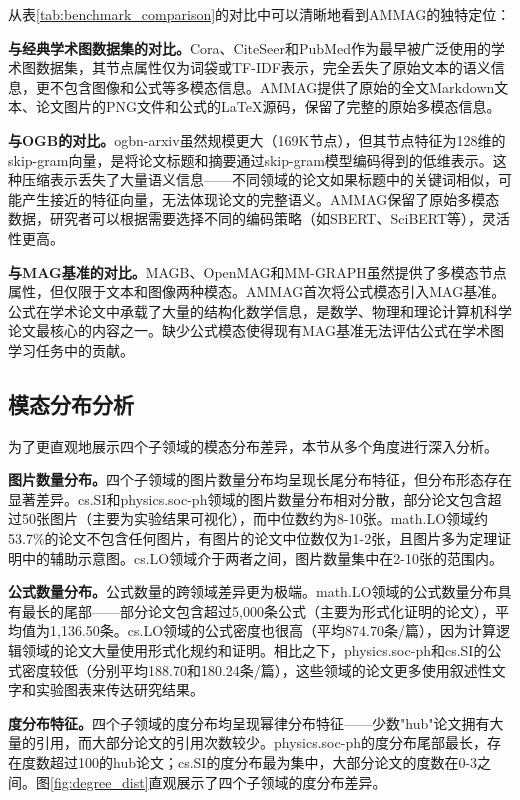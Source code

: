 从表\ref{tab:benchmark_comparison}的对比中可以清晰地看到AMMAG的独特定位：

\textbf{与经典学术图数据集的对比。}Cora\cite{sen2008collective}、CiteSeer\cite{giles1998citeseer}和PubMed\cite{sen2008collective}作为最早被广泛使用的学术图数据集，其节点属性仅为词袋或TF-IDF表示，完全丢失了原始文本的语义信息，更不包含图像和公式等多模态信息。AMMAG提供了原始的全文Markdown文本、论文图片的PNG文件和公式的LaTeX源码，保留了完整的原始多模态信息。

\textbf{与OGB的对比。}ogbn-arxiv\cite{hu2020ogb}虽然规模更大（169K节点），但其节点特征为128维的skip-gram向量，是将论文标题和摘要通过skip-gram模型编码得到的低维表示。这种压缩表示丢失了大量语义信息——不同领域的论文如果标题中的关键词相似，可能产生接近的特征向量，无法体现论文的完整语义。AMMAG保留了原始多模态数据，研究者可以根据需要选择不同的编码策略（如SBERT\cite{reimers2019sbert}、SciBERT\cite{beltagy2019scibert}等），灵活性更高。

\textbf{与MAG基准的对比。}MAGB\cite{yan2025magb}、OpenMAG\cite{wan2026openmag}和MM-GRAPH\cite{zhu2025mmgraph}虽然提供了多模态节点属性，但仅限于文本和图像两种模态。AMMAG首次将公式模态引入MAG基准。公式在学术论文中承载了大量的结构化数学信息，是数学、物理和理论计算机科学论文最核心的内容之一。缺少公式模态使得现有MAG基准无法评估公式在学术图学习任务中的贡献。

\subsection{模态分布分析}

为了更直观地展示四个子领域的模态分布差异，本节从多个角度进行深入分析。

\textbf{图片数量分布。}四个子领域的图片数量分布均呈现长尾分布特征，但分布形态存在显著差异。cs.SI和physics.soc-ph领域的图片数量分布相对分散，部分论文包含超过50张图片（主要为实验结果可视化），而中位数约为8-10张。math.LO领域约53.7\%的论文不包含任何图片，有图片的论文中位数仅为1-2张，且图片多为定理证明中的辅助示意图。cs.LO领域介于两者之间，图片数量集中在2-10张的范围内。

\textbf{公式数量分布。}公式数量的跨领域差异更为极端。math.LO领域的公式数量分布具有最长的尾部——部分论文包含超过5,000条公式（主要为形式化证明的论文），平均值为1,136.50条。cs.LO领域的公式密度也很高（平均874.70条/篇），因为计算逻辑领域的论文大量使用形式化规约和证明。相比之下，physics.soc-ph和cs.SI的公式密度较低（分别平均188.70和180.24条/篇），这些领域的论文更多使用叙述性文字和实验图表来传达研究结果。

\textbf{度分布特征。}四个子领域的度分布均呈现幂律分布特征——少数"hub"论文拥有大量的引用，而大部分论文的引用次数较少。physics.soc-ph的度分布尾部最长，存在度数超过100的hub论文；cs.SI的度分布最为集中，大部分论文的度数在0-3之间。图\ref{fig:degree_dist}直观展示了四个子领域的度分布差异。

